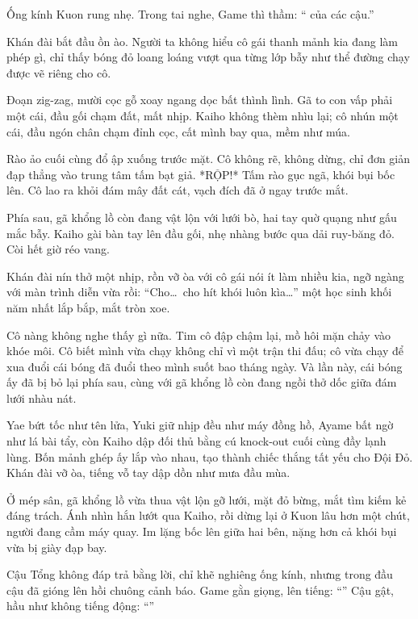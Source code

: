 \documentclass[../main.tex]{subfiles}
\begin{document}
Ống kính Kuon rung nhẹ. Trong tai nghe, Game thì thầm: `` của các cậu.''

Khán đài bắt đầu ồn ào. Người ta không hiểu cô gái thanh mảnh kia đang làm phép gì, chỉ thấy bóng đỏ loang loáng vượt qua từng lớp bẫy như thể đường chạy được vẽ riêng cho cô.

Đoạn zig-zag, mười cọc gỗ xoay ngang dọc bất thình lình. Gã to con vấp phải một cái, đầu gối chạm đất, mất nhịp. Kaiho không thèm nhìu lại; cô nhún một cái, đầu ngón chân chạm đỉnh cọc, cất mình bay qua, mềm như múa.

Rào ảo cuối cùng đổ ập xuống trước mặt. Cô không rẽ, không dừng, chỉ đơn giản đạp thẳng vào trung tâm tấm bạt giả. *RỘP!* Tấm rào gục ngã, khói bụi bốc lên. Cô lao ra khỏi đám mây đất cát, vạch đích đã ở ngay trước mắt.

Phía sau, gã khổng lồ còn đang vật lộn với lưới bò, hai tay quờ quạng như gấu mắc bẫy. Kaiho gài bàn tay lên đầu gối, nhẹ nhàng bước qua dải ruy-băng đỏ. Còi hết giờ réo vang.

Khán đài nín thở một nhịp, rồn vỡ òa với cô gái nói ít làm nhiều kia, ngỡ ngàng với màn trình diễn vừa rồi: ``Cho\dots\ cho hít khói luôn kìa\dots'' một học sinh khối năm nhất lắp bắp, mắt tròn xoe.

Cô nàng không nghe thấy gì nữa. Tim cô đập chậm lại, mồ hôi mặn chảy vào khóe môi. Cô biết mình vừa chạy không chỉ vì một trận thi đấu; cô vừa chạy để xua đuổi cái bóng đã đuổi theo mình suốt bao tháng ngày. Và lần này, cái bóng ấy đã bị bỏ lại phía sau, cùng với gã khổng lồ còn đang ngồi thở dốc giữa đám lưới nhàu nát.

\ct

Yae bứt tốc như tên lửa, Yuki giữ nhịp đều như máy đồng hồ, Ayame bất ngờ như lá bài tẩy, còn Kaiho dập đối thủ bằng cú knock-out cuối cùng đầy lạnh lùng. Bốn mảnh ghép ấy lắp vào nhau, tạo thành chiếc thắng tất yếu cho Đội Đỏ. Khán đài vỡ òa, tiếng vỗ tay dập dồn như mưa đầu mùa.

Ở mép sân, gã khổng lồ vừa thua vật lộn gỡ lưới, mặt đỏ bừng, mắt tìm kiếm kẻ đáng trách. Ánh nhìn hắn lướt qua Kaiho, rồi dừng lại ở Kuon lâu hơn một chút, người đang cầm máy quay. Im lặng bốc lên giữa hai bên, nặng hơn cả khói bụi vừa bị giày đạp bay.

Cậu Tổng không đáp trả bằng lời, chỉ khẽ nghiêng ống kính, nhưng trong đầu cậu đã gióng lên hồi chuông cảnh báo. Game gằn giọng, lên tiếng: ``'' Cậu gật, hầu như không tiếng động: ``''
\end{document}
